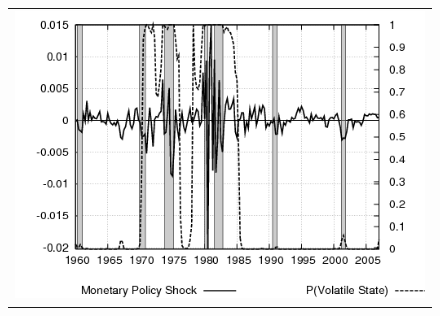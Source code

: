 \begin{figure}[ht]
\begin{center}
\begin{tabular}{c}
\includegraphics[scale=0.5]{results_cg_wlsinit/mpshock.png} 
\end{tabular}
\end{center}
\end{figure}

